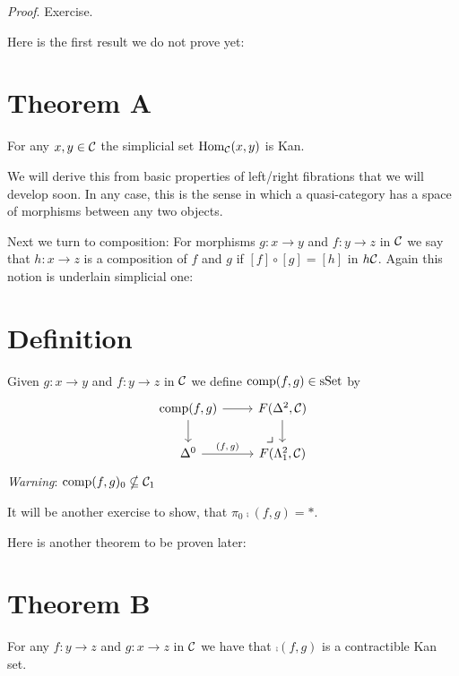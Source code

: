        \emph{Proof}. Exercise.
        \medskip

        Here is the first result we do not prove yet:

        \section{Theorem A}\label{chIII-4}
        For any $x, y \in \mathcal{C}$ the simplicial set $\operatorname{Hom}_{\mathcal{C}}(x, y)$ is Kan.
        \smallskip

        We will derive this from basic properties of left/right fibrations that we will develop soon. In any case, this is the sense in which a quasi-category has a space of morphisms between any two objects.

        Next we turn to composition: For morphisms $g \colon x \to y$ and $f \colon y \to z$ in $\mathcal{C}$ we say that $h \colon x \to z$ is a composition of $f$ and $g$ if $\left[ f \right] \circ \left[ g \right] = \left[ h \right]$ in $h\mathcal{C}$. Again this notion is underlain simplicial one:

        \section{Definition}\label{chIII-5}
        Given $g \colon x \to y$ and $f \colon y \to z$ in $\mathcal{C}$ we define $\operatorname{comp}(f, g) \in \operatorname{sSet}$ by
        \begin{equation*}
            \begin{tikzcd}
                \comp(f, g) \arrow[r] \arrow[d] \arrow[dr, phantom, "\pb", very near end, end anchor={[xshift=-1ex]north}] & F(\Delta^2, \Cc) \arrow[d] \\
                \Delta^0 \arrow[r, "{(f,\, g)}"] & F(\horn{2}{1}, \Cc)
            \end{tikzcd}
        \end{equation*}
        \emph{Warning}: $\operatorname{comp}(f, g)_0 \nsubseteq \mathcal{C}_1$
        \smallskip

        It will be another exercise to show, that $\pi_0 \comp(f, g) = *$.
        \medskip

        Here is another theorem to be proven later:

        \section{Theorem B}\label{chIII-6}
        For any $f \colon y \to z$ and $g \colon x \to z$ in $\mathcal{C}$ we have that $\comp(f, g)$ is a contractible Kan set.
        \smallskip

